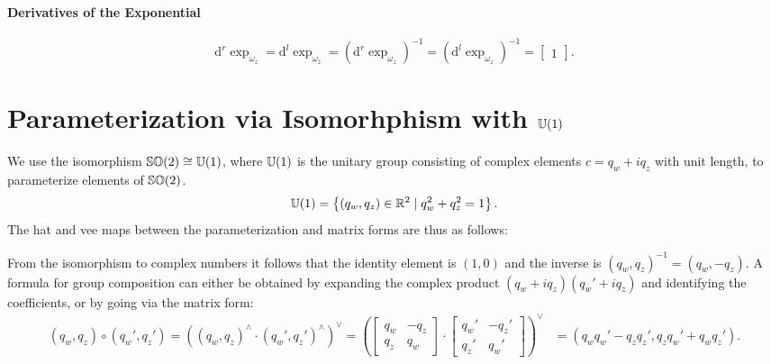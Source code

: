 \begin{properties}[breakable, title={$\SOtwo$ formula sheet}]
  \paragraph{Derivatives of the Exponential}
  \begin{equation}
    \mathrm{d}^r \exp_{\omega_z} =
    \mathrm{d}^l \exp_{\omega_z} =
    \left( \mathrm{d}^r \exp_{\omega_z} \right)^{-1} =
    \left( \mathrm{d}^l \exp_{\omega_z} \right)^{-1} = \begin{bmatrix} 1 \end{bmatrix}.
  \end{equation}
\end{properties}

\section{Parameterization via Isomorhphism with \texorpdfstring{${\mathbb{U}(1)}$}{U(1)}}

We use the isomorphism ${\mathbb{SO}(2)} \cong {\mathbb{U}(1)}$, where ${\mathbb{U}(1)}$ is the unitary group consisting of complex elements $c = q_{w} + i q_{z}$ with unit length, to parameterize elements of $\SOtwo$.
\begin{equation}
  {\mathbb{U}(1)} = \left\{ (q_w, q_z) \in \mathbb{R}^{2} \mid q_w^2 + q_z^2 = 1 \right\}.
\end{equation}
The hat and vee maps between the parameterization and matrix forms are thus as follows:
\begin{center}
\end{center}

From the isomorphism to complex numbers it follows that the identity element is $(1, 0)$ and the inverse is
$(q_w, q_z)^{-1} = (q_w, -q_z)$. A formula for group composition can either be obtained by expanding the complex product $(q_{w} + i q_{z}) (q_{w}' + i q_{z})$ and identifying the coefficients, or by going via the matrix form:
\begin{equation*}
  \begin{aligned}
    (q_w, q_z) \circ (q_w', q_z') = \left( (q_w, q_z)^\wedge \cdot (q_w', q_z')^\wedge \right)^\vee = \left( \begin{bmatrix}
      q_w & -q_z \\ q_z & q_w
    \end{bmatrix} \cdot \begin{bmatrix}
      q_w' & -q_z' \\ q_z' & q_w'
    \end{bmatrix}  \right)^\vee & = (q_w q_w' - q_z q_z', q_z q_w' + q_w q_z').
  \end{aligned}
\end{equation*}

